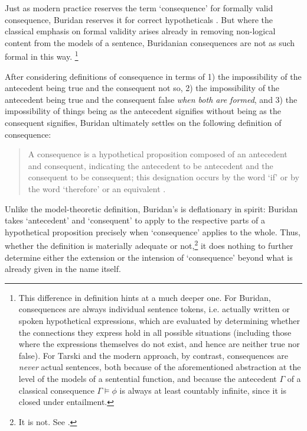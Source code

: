 \documentclass[]{article}
\begin{document}
Just as modern practice reserves the term `consequence' for formally valid consequence, Buridan reserves it for correct hypotheticals \autocite[I. 3, 66]{Buridan2015}. But where the classical emphasis on formal validity arises already in removing non-logical content from the models of a sentence, Buridanian consequences are not as such formal in this way. \footnote{This difference in definition hints at a much deeper one. For Buridan, consequences are always individual sentence tokens, i.e. actually written or spoken hypothetical expressions, which are evaluated by determining whether the connections they express hold in all possible situations (including those where the expressions themselves do not exist, and hence are neither true nor false). For Tarski and the modern approach, by contrast, consequences are \textit{never} actual sentences, both because of the aforementioned abstraction at the level of the models of a sentential function, and because the antecedent $\Gamma$ of a classical consequence $\Gamma \models \phi$ is always at least countably infinite, since it is closed under entailment.}


After considering definitions of consequence in terms of 1) the impossibility of the antecedent being true and the consequent not so, 2) the impossibility of the antecedent being true and the consequent false \textit{when both are formed}, and 3) the impossibility of things being as the antecedent signifies without being as the consequent signifies, Buridan ultimately settles on the following definition of consequence: 

\begin{quote}
	A consequence is a hypothetical proposition composed of an antecedent and consequent, indicating the antecedent to be antecedent and the consequent to be consequent; this designation occurs by the word `if' or by the word `therefore' or an equivalent \autocite[I. 3, 67]{Buridan2015}.
\end{quote}

Unlike the model-theoretic definition, Buridan's is deflationary in spirit: Buridan takes `antecedent' and `consequent' to apply to the respective parts of a hypothetical proposition precisely when `consequence' applies to the whole. Thus, whether the definition is materially adequate or not,\footnote{It is not. See \autocite[55-60]{Archambault2017d}.} it does nothing to further determine either the extension or the intension of `consequence' beyond what is already given in the name itself.
\end{document}
